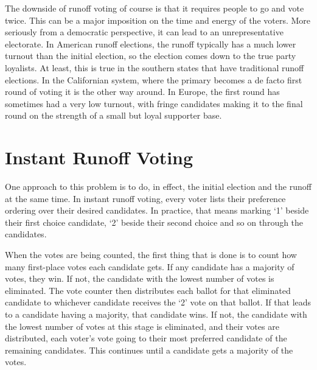 \begin{multicols}{2}
The downside of runoff voting of course is that it requires people to go and vote twice. This can be a major imposition on the time and energy of the voters. More seriously from a democratic perspective, it can lead to an unrepresentative electorate. In American runoff elections, the runoff typically has a much lower turnout than the initial election, so the election comes down to the true party loyalists. At least, this is true in the southern states that have traditional runoff elections. In the Californian system, where the primary becomes a de facto first round of voting it is the other way around. In Europe, the first round has sometimes had a very low turnout, with fringe candidates making it to the final round on the strength of a small but loyal supporter base.

\section{Instant Runoff Voting}
One approach to this problem is to do, in effect, the initial election and the runoff at the same time. In instant runoff voting, every voter lists their preference ordering over their desired candidates. In practice, that means marking `1' beside their first choice candidate, `2' beside their second choice and so on through the candidates. 

When the votes are being counted, the first thing that is done is to count how many first-place votes each candidate gets. If any candidate has a majority of votes, they win. If not, the candidate with the lowest number of votes is eliminated. The vote counter then distributes each ballot for that eliminated candidate to whichever candidate receives the `2' vote on that ballot. If that leads to a candidate having a majority, that candidate wins. If not, the candidate with the lowest number of votes at this stage is eliminated, and their votes are distributed, each voter's vote going to their most preferred candidate of the remaining candidates. This continues until a candidate gets a majority of the votes.


\end{multicols}
